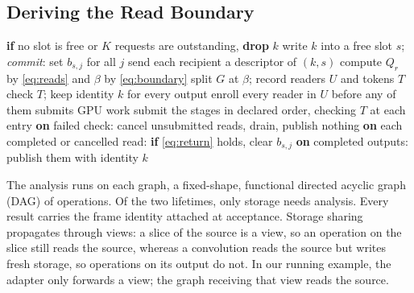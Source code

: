 \documentclass[conference]{IEEEtran}
\begin{document}
\subsection{Deriving the Read Boundary}
\label{sec:derive}

\begin{algorithm}[t]
\caption{BIM's commit and ReadSeal's plan and invocation}
\label{alg:readseal}
\footnotesize
\begin{algorithmic}[1]
\State \textbf{if} no slot is free or $K$ requests are outstanding, \textbf{drop} $k$
\State write $k$ into a free slot $s$; \emph{commit}: set $b_{s,j}$ for all $j$
\State send each recipient a descriptor of $(k,s)$
\EndProcedure
{}
\State compute $Q_r$ by \eqref{eq:reads} and $\beta$ by \eqref{eq:boundary}
\State split $G$ at $\beta$; record readers $U$ and tokens $T$
\EndProcedure
{}
\State check $T$; keep identity $k$ for every output
\State enroll every reader in $U$ before any of them submits GPU work
\State submit the stages in declared order, checking $T$ at each entry
\State \textbf{on} failed check: cancel unsubmitted reads, drain, publish nothing
\State \textbf{on} each completed or cancelled read: \textbf{if} \eqref{eq:return} holds, clear $b_{s,j}$
\State \textbf{on} completed outputs: publish them with identity $k$
\EndProcedure
\end{algorithmic}
\end{algorithm}

The analysis runs on each graph, a fixed-shape, functional directed acyclic graph (DAG) of operations. Of the two lifetimes, only storage needs analysis. Every result carries the frame identity attached at acceptance. Storage sharing propagates through views: a slice of the source is a view, so an operation on the slice still reads the source, whereas a convolution reads the source but writes fresh storage, so operations on its output do not. In our running example, the adapter only forwards a view; the graph receiving that view reads the source.
\end{document}

